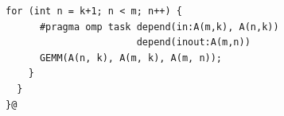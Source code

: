 \documentclass[xcolor={usenames,dvipsnames,svgnames,table}, aspectratio=43]{beamer}
\begin{document}
\begin{frame}[fragile]
\begin{minipage}[t]{0.52\linewidth}
\begin{onlyenv}
\begin{lstlisting}[style=transparency]
    for (int n = k+1; n < m; n++) {
      #pragma omp task depend(in:A(m,k), A(n,k))
                       depend(inout:A(m,n))
      GEMM(A(n, k), A(m, k), A(m, n));
    }
  }
}@
  \end{lstlisting}
\end{onlyenv}
\end{minipage}
\begin{minipage}[t]{0.46\linewidth}
  \vspace{-0.3cm}
\begin{figure}
\end{figure}
\end{minipage}
\end{frame}
\end{document}
